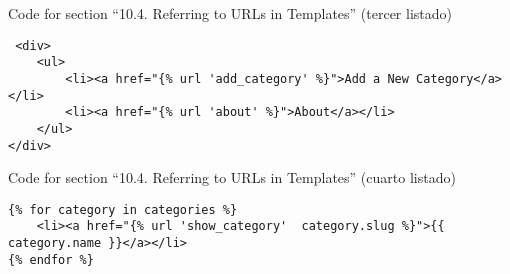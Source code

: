 \documentclass[12pt]{article} %
\begin{document}
Code for section ``10.4. Referring to URLs in Templates'' (tercer listado)

\begin{verbatim}
 <div>
    <ul>
        <li><a href="{% url 'add_category' %}">Add a New Category</a></li>
        <li><a href="{% url 'about' %}">About</a></li>
    </ul>
</div>
\end{verbatim}
Code for section ``10.4. Referring to URLs in Templates'' (cuarto listado)
\begin{verbatim}
{% for category in categories %}
    <li><a href="{% url 'show_category'  category.slug %}">{{ category.name }}</a></li>
{% endfor %}
\end{verbatim}
\end{document}
